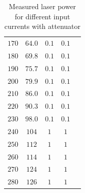 \documentclass{protokoll_en}
\begin{document}
\begin{appendix}
\begin{table}[H]
{\begin{tabular}{lcccc}
$170$ & $64.0$ & $0.1$ & $0.1$\\
$180$ & $69.8$ & $0.1$ & $0.1$\\
$190$ & $75.7$ & $0.1$ & $0.1$\\
$200$ & $79.9$ & $0.1$ & $0.1$\\
$210$ & $86.0$ & $0.1$ & $0.1$\\
$220$ & $90.3$ & $0.1$ & $0.1$\\
$230$ & $98.0$ & $0.1$ & $0.1$\\
$240$ & $104$ & $1$ & $1$\\
$250$ & $112$ & $1$ & $1$\\
$260$ & $114$ & $1$ & $1$\\
$270$ & $124$ & $1$ & $1$\\
$280$ & $126$ & $1$ & $1$\\
    \bottomrule
  \end{tabular}
}
\caption{Measured laser power for different input currents with attenuator}
  \label{tab:ana_laserpower_att}
\end{table}
\begin{table}[H]
  \centering
{}
\caption{Measured laser power for different input currents without attenuator}
  \label{tab:ana_laserpower_woatt}
\end{table}


\end{appendix}
\end{document}
